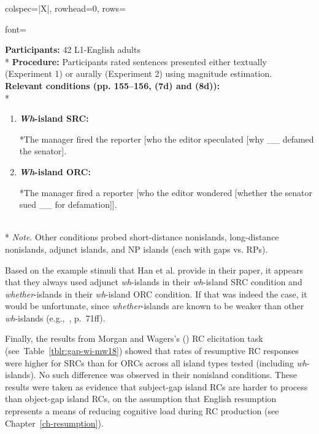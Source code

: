\begin{longtblr}[caption={\textcite{han.etal2012}: Acceptability judgment task}, label={tblr:gap-wi-h12}]{colspec={|X|}, rowhead=0, rows={font=\raggedright{}}}\hline
\textbf{Participants:} 42 L1-English adults \vspace{5pt}\\*
\textbf{Procedure:} Participants rated sentences presented either textually (Experiment 1) or aurally (Experiment 2) using magnitude estimation. \vspace{5pt}\\
\textbf{Relevant conditions (pp. 155--156, (7d) and (8d)):} \vspace{5pt}\\*
\begin{varwidth}{\linewidth}\begin{enumerate}[\bfseries (a),itemsep=5pt] 
\item \textbf{\textit{Wh}-island SRC:}\par\nobreak\vspace{3pt}
*The manager fired the reporter [who the editor speculated [why \_\_ defamed the senator].
\item \textbf{\textit{Wh}-island ORC:}\par\nobreak\vspace{3pt}
*The manager fired a reporter [who the editor wondered [whether the senator sued \_\_ for defamation]].
\end{enumerate}\end{varwidth}\vspace{5pt}\\*
\textit{Note}. Other conditions probed short-distance nonislands, long-distance nonislands, adjunct islands, and NP islands (each with gaps vs. RPs). \\\hline
\end{longtblr}

\noindent Based on the example stimuli that Han et al. provide in their paper, it appears that they always used adjunct \textit{wh}-islands in their \textit{wh}-island SRC condition and \textit{whether}-islands in their \textit{wh}-island ORC condition. If that was indeed the case, it would be unfortunate, since \textit{whether}-islands are known to be weaker than other \textit{wh}-islands (e.g.,~\cite{phillips2013}, p.~71ff).

Finally, the results from Morgan and Wagers's (\citeyear{morgan.wagers2018}) RC elicitation task (see~Table~\ref{tblr:gap-wi-mw18}) showed that rates of resumptive RC responses were higher for SRCs than for ORCs across all island types tested (including \textit{wh}-islands). No such difference was observed in their nonisland conditions. These results were taken as evidence that subject-gap island RCs are harder to process than object-gap island RCs, on the assumption that English resumption represents a means of reducing cognitive load during RC production (see Chapter~\ref{ch-resumption}).

